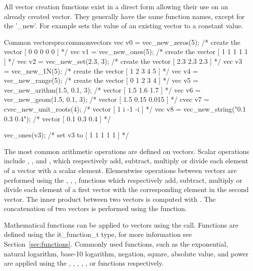     All vector creation functions exist in a direct form allowing
    their use on an already created vector. They generally have the
    same function names, except for the '\_new'. For example
     sets the value of an existing vector to a
    constant value.

\begin{program}{Common vectors}{pro:commonvectors}
vec v0 = vec_new_zeros(5);    /* create the vector [ 0 0 0 0 0 ]   */
vec v1 = vec_new_ones(5);     /* create the vector [ 1 1 1 1 1 ]   */
vec v2 = vec_new_set(2.3, 3); /* create the vector [ 2.3 2.3 2.3 ] */
vec v3 = vec_new_1N(5);       /* create the vector [ 1 2 3 4 5 ]   */
vec v4 = vec_new_range(5);    /* create the vector [ 0 1 2 3 4 ]   */
vec v5 = vec_new_arithm(1.5, 0.1, 3); /* vector [ 1.5 1.6 1.7 ]    */
vec v6 = vec_new_geom(1.5, 0.1, 3);   /* vector [ 1.5 0.15 0.015 ] */
cvec v7 = cvec_new_unit_roots(4);     /* vector [ 1 i -1 -i ]      */
vec v8 = vec_new_string("0.1 0.3 0.4"); /* vector [ 0.1 0.3 0.4 ]  */

vec_ones(v3);                           /* set v3 to [ 1 1 1 1 1 ] */
\end{program}

    The most common arithmetic operations are defined on vectors. Scalar
    operations include , ,
     and , which respectively add,
    subtract, multiply or divide each element of a vector with a
    scalar element. Elementwise operations between vectors are
    performed using the , , 
    ,  functions which respectively
    add, subtract, multiply or divide each element of a first vector
    with the corresponding element in the second vector. The inner
    product between two vectors is computed with . The
    concatenation of two vectors is performed using the  function.  

    Mathematical functions can be applied to vectors using the
     call. Functions are defined
    using the it\_function\_t type, for more information see
    Section~\ref{sec:functions}. Commonly used functions, such as the
    exponential, natural logarithm, base-10 logarithm, negation,
    square, absolute value, and power are applied using the
    , ,
    , ,
    ,  or
     functions respectively.

